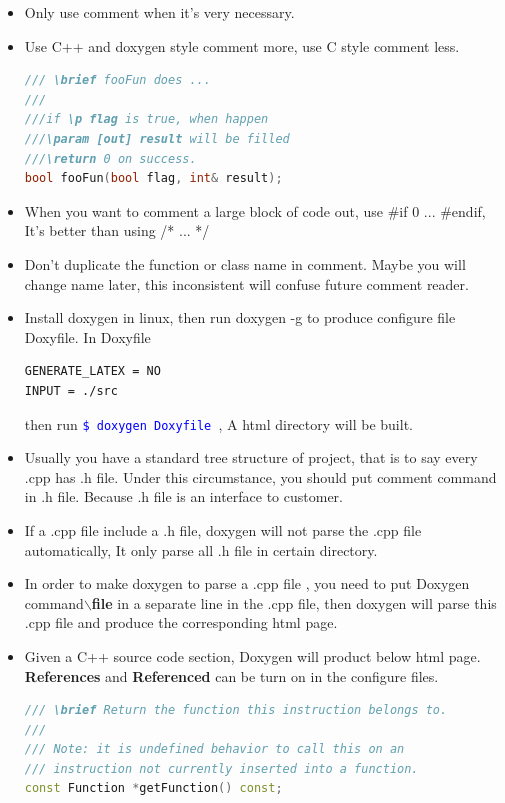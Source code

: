 \documentclass[a4paper,12pt,twoside]{book}
\newcommand{\linuxcommand}[1]{\texttt{\textcolor{blue}{\$ #1 \Pisymbol{psy}{191}}}}
\begin{document}
\begin{itemize}
\item Only use comment when it's very necessary.
\item Use C++ and doxygen style comment more, use C style comment less.
\begin{lstlisting}[frame=single, language=c++]
/// \brief fooFun does ...
///
///if \p flag is true, when happen
///\param [out] result will be filled
///\return 0 on success.
bool fooFun(bool flag, int& result);
\end{lstlisting}
\item When you want to comment a large block of code out, use \#if 0 ...  \#endif, It's better than using /* ... */


\item Don't duplicate the function or class name in comment. Maybe you will change name later, this inconsistent will confuse future comment reader.

\item Install doxygen in linux, then run doxygen -g to produce configure file Doxyfile.  In Doxyfile
\begin{verbatim}
GENERATE_LATEX = NO
INPUT = ./src
\end{verbatim}
then run \linuxcommand{doxygen Doxyfile}, A html directory will be built.

\item Usually you have a standard tree structure of project, that is to say every .cpp has .h file.  Under this circumstance, you should put comment command in .h file. Because .h file is an interface to customer.

\item If a .cpp file include a .h file,  doxygen will not parse the .cpp file automatically, It only parse all .h file in certain directory.

\item In order to make doxygen to parse a .cpp file , you need to put Doxygen command\textbf{$\backslash$file} in a separate line in the .cpp file, then doxygen will parse this .cpp file and produce the corresponding html page.


\item Given a C++ source code section, Doxygen will product below html page.  \textbf{References} and \textbf{Referenced} can be turn on in the configure files.

\begin{lstlisting}[frame=single, language=c++]
/// \brief Return the function this instruction belongs to.
///
/// Note: it is undefined behavior to call this on an
/// instruction not currently inserted into a function.
const Function *getFunction() const;
\end{lstlisting}


\end{itemize}
\end{document}
